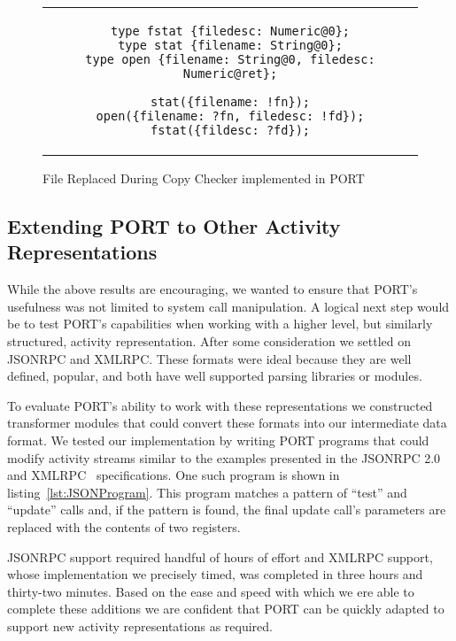 \begin{figure}[H]
\centering
\begin{tabular}{c}
\begin{lstlisting}
type fstat {filedesc: Numeric@0};
type stat {filename: String@0};
type open {filename: String@0, filedesc: Numeric@ret};

stat({filename: !fn});
open({filename: ?fn, filedesc: !fd});
fstat({fildesc: ?fd});
\end{lstlisting}
\end{tabular}
\caption{File Replaced During Copy Checker implemented in PORT}
\label{lst:FileReplacedPORT}
\end{figure}

\subsection{Extending PORT to Other Activity Representations}

While the above results are encouraging, we wanted to ensure that PORT's
usefulness was not limited to system call manipulation.
A logical next step would be to test PORT's capabilities when working
with a higher level, but similarly structured, activity representation.
After some consideration we settled on JSONRPC and XMLRPC.  These formats
were ideal because they are well defined, popular, and both have well
supported parsing libraries or modules.

To evaluate PORT's ability to work with these representations we
constructed transformer modules that could convert these formats into our
intermediate data format.
We tested our implementation by writing PORT programs that could modify
activity streams similar to the examples presented in the JSONRPC
2.0~\cite{jsonspec} and XMLRPC~\cite{xmlspec}
specifications.  One such program is shown in
listing~\ref{lst:JSONProgram}.  This program matches a pattern of ``test''
and ``update'' calls and, if the pattern is found, the final update call's
parameters are replaced with the contents of two registers.

JSONRPC support required handful of hours of effort and XMLRPC
support, whose implementation we precisely timed, was completed in three
hours and thirty-two minutes.  Based on the ease and speed with which we
ere able to complete these additions we are confident that PORT can be
quickly adapted to support new activity representations as required.

